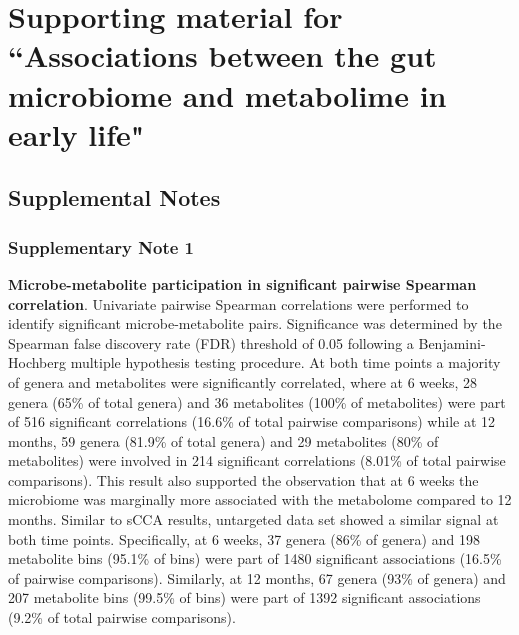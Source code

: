 \chapter{Supporting material for ``Associations between the gut microbiome and metabolime in early life"}

\section{Supplemental Notes} 
\subsection{Supplementary Note 1} \label{appB_note1}
{\bf Microbe-metabolite participation in significant pairwise Spearman correlation}. Univariate pairwise Spearman correlations were performed to identify significant microbe-metabolite pairs. Significance was determined by the Spearman false discovery rate (FDR) threshold of 0.05 following a Benjamini-Hochberg multiple hypothesis testing procedure.  At both time points a majority of genera and metabolites were significantly correlated, where at 6 weeks, 28 genera (65\% of total genera) and 36 metabolites (100\% of metabolites) were part of 516 significant correlations (16.6\% of total pairwise comparisons) while at 12 months, 59 genera (81.9\% of total genera) and 29 metabolites (80\% of metabolites) were involved in 214 significant correlations (8.01\% of total pairwise comparisons). This result also supported the observation that at 6 weeks the microbiome was marginally more associated with the metabolome compared to 12 months. Similar to sCCA results, untargeted data set showed a similar signal at both time points. Specifically, at 6 weeks, 37 genera (86\% of genera) and 198 metabolite bins (95.1\% of bins) were part of 1480 significant associations (16.5\% of pairwise comparisons). Similarly, at 12 months, 67 genera (93\% of genera) and 207 metabolite bins (99.5\% of bins) were part of 1392 significant associations (9.2\% of total pairwise comparisons). 

